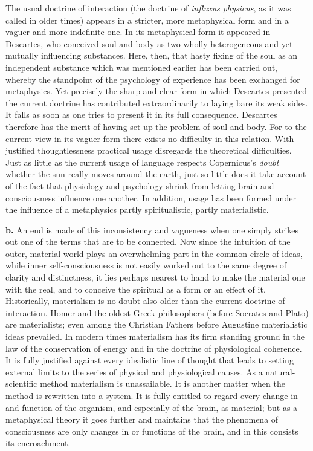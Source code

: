 \documentclass[12pt,a4paper]{book}
\newcommand{\opage}[1]{\marginnote{\footnotesize\textit{[#1]}}}
\begin{document}
The usual doctrine of interaction (the doctrine of \textit{influxus
physicus}, as it was called in older times) appears in a stricter, more
metaphysical form and in a vaguer and more indefinite one. In its
metaphysical form it appeared in Descartes, who conceived soul and body
as two wholly heterogeneous and yet mutually influencing substances.
Here, then, that hasty fixing of the soul as an independent substance
which was mentioned earlier has been carried out, whereby the standpoint
of the psychology of experience has been exchanged for metaphysics. Yet
precisely the sharp and clear form in which Descartes presented the
current doctrine has contributed extraordinarily to laying bare its weak
sides. It falls as soon as one tries to present it in its full
consequence. Descartes therefore has the merit of having set up the
problem of soul and body. For to the current view in its vaguer form
there exists
\opage{71}no difficulty in this relation. With justified
thoughtlessness practical usage disregards the theoretical difficulties.
Just as little as the current usage of language respects Copernicus's
\emph{doubt} whether the sun really moves around the earth, just so
little does it take account of the fact that physiology and psychology
shrink from letting brain and consciousness influence one another. In
addition, usage has been formed under the influence of a metaphysics
partly spiritualistic, partly materialistic.

\textbf{b.} An end is made of this inconsistency and vagueness when one
simply strikes out one of the terms that are to be connected. Now since
the intuition of the outer, material world plays an overwhelming part in
the common circle of ideas, while inner self-consciousness is not easily
worked out to the same degree of clarity and distinctness, it lies
perhaps nearest to hand to make the material one with the real, and to
conceive the spiritual as a form or an effect of it. Historically,
materialism is no doubt also older than the current doctrine of
interaction. Homer and the oldest Greek philosophers (before Socrates and
Plato) are materialists; even among the Christian Fathers before
Augustine materialistic ideas prevailed. In modern times materialism has
its firm standing ground in the law of the conservation of energy and in
the doctrine of physiological coherence. It is fully justified against
every idealistic line of thought that leads to setting external limits
to the series of physical and physiological causes. As a
natural-scientific method materialism is unassailable. It is another
matter when the method is rewritten into a system. It is fully entitled
to regard every change in and function of the organism, and especially
of the brain, as material; but as a metaphysical theory it goes further
and maintains that the phenomena of consciousness are only changes in or
functions of the brain, and in this consists its encroachment.
\end{document}
